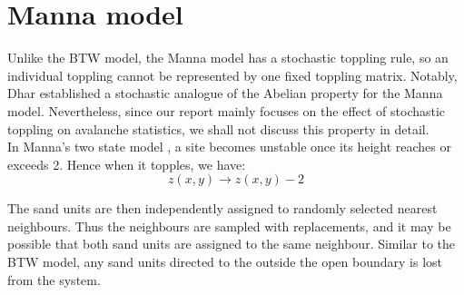 \section{Manna model}\label{sec:manna}

Unlike the BTW model, the Manna model has a stochastic toppling rule, so an individual toppling cannot be represented by one fixed toppling matrix. Notably, Dhar \cite{Dhar1999Manna} established a stochastic analogue of the Abelian property for the Manna model. Nevertheless, since our report mainly focuses on the effect of stochastic toppling on avalanche statistics, we shall not discuss this property in detail.\\

In Manna's two state model \cite{Manna1991TwoState}, a site becomes unstable once its height reaches or exceeds 2. Hence when it topples, we have:
\[
z(x,y) \rightarrow z(x,y)-2
\]

The sand units are then independently assigned to randomly selected nearest neighbours. Thus the neighbours are sampled with replacements, and it may be possible that both sand units are assigned to the same neighbour. Similar to the BTW model, any sand units directed to the outside the open boundary is lost from the system.


